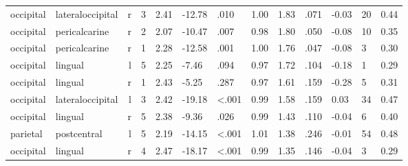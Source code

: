 \documentclass{article}
\begin{document}
\begin{longtable}{llrR{1.3cm}R{1cm}R{1.3cm}R{1cm}R{1cm}R{1.3cm}R{1cm}R{1.8cm}R{1.3cm}R{1.8cm}}
 occipital &          lateraloccipital &    r &         3 &                  2.41 &           -12.78 &               .010 &                               1.00 &                          1.83 &                            .071 &  -0.03 &     20 &      0.44 \\
 occipital &             pericalcarine &    r &         2 &                  2.07 &           -10.47 &               .007 &                               0.98 &                          1.80 &                            .050 &  -0.08 &     10 &      0.35 \\
 occipital &             pericalcarine &    r &         1 &                  2.28 &           -12.58 &               .001 &                               1.00 &                          1.76 &                            .047 &  -0.08 &      3 &      0.30 \\
 occipital &                   lingual &    l &         5 &                  2.25 &            -7.46 &               .094 &                               0.97 &                          1.72 &                            .104 &  -0.18 &      1 &      0.29 \\
 occipital &                   lingual &    r &         1 &                  2.43 &            -5.25 &               .287 &                               0.97 &                          1.61 &                            .159 &  -0.28 &      5 &      0.31 \\
 occipital &          lateraloccipital &    l &         3 &                  2.42 &           -19.18 &      \textless.001 &                               0.99 &                          1.58 &                            .159 &   0.03 &     34 &      0.47 \\
 occipital &                   lingual &    r &         5 &                  2.38 &            -9.36 &               .026 &                               0.99 &                          1.43 &                            .110 &  -0.04 &      6 &      0.40 \\
  parietal &               postcentral &    l &         5 &                  2.19 &           -14.15 &      \textless.001 &                               1.01 &                          1.38 &                            .246 &  -0.01 &     54 &      0.48 \\
 occipital &                   lingual &    r &         4 &                  2.47 &           -18.17 &      \textless.001 &                               0.99 &                          1.35 &                            .146 &  -0.04 &      3 &      0.29 \\

\end{longtable}
\end{document}
